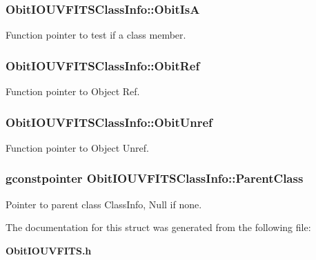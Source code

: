 \subsubsection{ {\bf Obit\-IOUVFITSClass\-Info::Obit\-Is\-A}}\label{structObitIOUVFITSClassInfo_o12}


Function pointer to test if a class member. 

\subsubsection{ {\bf Obit\-IOUVFITSClass\-Info::Obit\-Ref}}\label{structObitIOUVFITSClassInfo_o10}


Function pointer to Object Ref. 

\subsubsection{ {\bf Obit\-IOUVFITSClass\-Info::Obit\-Unref}}\label{structObitIOUVFITSClassInfo_o11}


Function pointer to Object Unref. 

\subsubsection{\setlength{\rightskip}{0pt plus 5cm}gconstpointer {\bf Obit\-IOUVFITSClass\-Info::Parent\-Class}}\label{structObitIOUVFITSClassInfo_o3}


Pointer to parent class Class\-Info, Null if none. 



The documentation for this struct was generated from the following file:\begin{CompactItemize}
\item 
{\bf Obit\-IOUVFITS.h}\end{CompactItemize}
